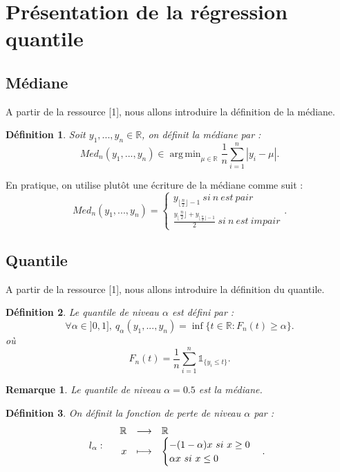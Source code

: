 \documentclass{article}
\DeclareMathOperator*{\argmin}{arg\,min}
\newtheorem{definition}{Définition}
\newtheorem{remark}{Remarque}
\newcommand{\floor}[1]{\lfloor #1 \rfloor}
\begin{document}
\vspace{0.5cm}

\section{Présentation de la régression quantile}
\vspace{0.2cm}
\subsection{Médiane}
A partir de la ressource [1], nous allons introduire la définition de la médiane. 
\vspace{0.1cm}
\begin{definition}
Soit $y_1, ..., y_n \in \mathbb{R}$, on définit la \textit{médiane} par :
$$Med_{n}(y_1, ..., y_n) \in \argmin_{\mu \in \mathbb{R}} \frac{1}{n} \sum\limits_{i=1}^{n} | y_i - \mu |.$$
\end{definition}
\vspace{0.1cm}
En pratique, on utilise plutôt une écriture de la médiane comme suit : 
$$Med_{n}(y_1, ..., y_n) =
\begin{cases}
y_{\floor{\frac{n}{2}}-1} \ si \ n \ est \ pair \\
\frac{y_\floor{\frac{n}{2}} + y_{\floor{\frac{n}{2}}-1}}{2} \ si \ n \ est \ impair
\end{cases}
.
$$
\vspace{0.2cm}
\subsection{Quantile}
A partir de la ressource [1], nous allons introduire la définition du quantile. 
\vspace{0.1cm}
\begin{definition}
Le \textit{quantile de niveau $\alpha$} est défini par :
$$\forall \alpha \in ]0, 1], \ q_{\alpha}(y_1, ..., y_n) = \inf \{t \in \mathbb{R} : F_n(t) \geq \alpha \}.$$
où
$$F_n(t) = \frac{1}{n} \sum\limits_{i=1}^{n}\mathbb{1}_{\{y_i \leq t \}}.$$
\end{definition}
\vspace{0.1cm}
\begin{remark} 
Le quantile de niveau $\alpha = 0.5$ est la médiane.
\end{remark}
\vspace{0.1cm}
\begin{definition}
On définit la \textit{fonction de perte de niveau $\alpha$} par :
$$l_\alpha : 
\begin{array}{l rcl}
 & \mathbb{R} & \longrightarrow & \mathbb{R} \\
    & x & \longmapsto &  \begin{cases}
-(1 - \alpha)x \ si \ x \geq 0 \\
\alpha x \ si \ x \leq 0
\end{cases}
.
\end{array}
$$
\end{definition}
\vspace{0.2cm}
\end{document}
